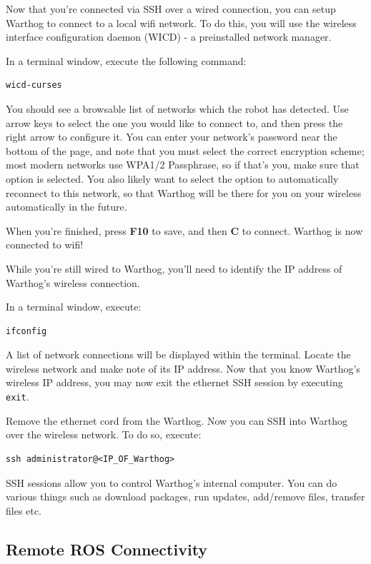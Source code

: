 \documentclass[]{clearpath-latex/clearpath-manual}
\begin{document}
Now that you're connected via SSH over a wired connection, you can setup Warthog to connect to a local wifi network.  To do this, you will use the wireless interface configuration daemon (WICD) - a preinstalled network manager.  

In a terminal window, execute the following command:

\begin{lstlisting}
wicd-curses
\end{lstlisting}

You should see a browsable list of networks which the robot has detected. Use arrow keys to select the one you would like to connect to, and then press the right arrow to configure it. You can enter your network’s password near the bottom of the page, and note that you must select the correct encryption scheme; most modern networks use WPA1/2 Passphrase, so if that’s you, make sure that option is selected. You also likely want to select the option to automatically reconnect to this network, so that Warthog will be there for you on your wireless automatically in the future.  

When you’re finished, press \textbf{F10} to save, and then \textbf{C} to connect.  Warthog is now connected to wifi!  

While you're still wired to Warthog, you'll need to identify the IP address of Warthog's wireless connection.  

In a terminal window, execute:

\begin{lstlisting}
ifconfig
\end{lstlisting}

A list of network connections will be displayed within the terminal.  Locate the wireless network and make note of its IP address. Now that you know Warthog's wireless IP address, you may now exit the ethernet SSH session by executing \lstinline{exit}.

Remove the ethernet cord from the Warthog.   Now you can SSH into Warthog over the wireless network.  To do so, execute:

\begin{lstlisting}
ssh administrator@<IP_OF_Warthog>
\end{lstlisting}

SSH sessions allow you to control Warthog's internal computer.  You can do various things such as download packages, run updates, add/remove files, transfer files etc. 

\subsection{Remote ROS Connectivity}
\end{document}
